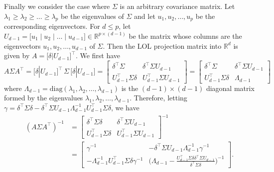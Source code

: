 \documentclass[10pt]{article}
\begin{document}
Finally we consider the case where $\Sigma$ is an arbitrary covariance matrix. Let $\lambda_1 \geq \lambda_2 \geq \dots \geq \lambda_{p}$ be the eigenvalues of $\Sigma$ and let $u_1, u_2, \dots, u_p$ be the corresponding eigenvectors. For $d \leq p$,  let $U_{d-1} = \bigl[ u_1 \mid u_2 \mid \dots \mid u_{d-1}] \in \mathbb{R}^{p \times (d-1)}$ be the matrix whose columns are the eigenvectors $u_1, u_2, \dots, u_{d-1}$ of $\Sigma$. Then the LOL projection matrix into $\mathbb{R}^{d}$ is given by $A = \bigl[ \delta | U_{d-1} \bigr]^{\top}$. We first have
\begin{equation*}
A \Sigma A^{\top} = \bigl[ \delta | U_{d-1} \bigr]^{\top}\, \Sigma \, \bigl[ \delta | U_{d-1} \bigr] = \begin{bmatrix} \delta^{\top} \Sigma & \delta^{\top} \Sigma U_{d-1} \\ U_{d-1}^{\top} \Sigma \delta & U_{d-1}^{\top} \Sigma U_{d-1} \end{bmatrix} = \begin{bmatrix} \delta^{\top} \Sigma & \delta^{\top} \Sigma U_{d-1} \\ U_{d-1}^{\top} \Sigma \delta & \Lambda_{d-1} \end{bmatrix}
\end{equation*}
where $\Lambda_{d-1} = \mathrm{diag}(\lambda_1, \lambda_2, \dots, \lambda_{d-1})$ is the $(d-1) \times (d-1)$ diagonal matrix formed by the eigenvalues $\lambda_1, \lambda_2, \dots, \lambda_{d-1}$.
Therefore, letting $\gamma = \delta^{\top} \Sigma \delta - \delta^{\top} \Sigma U_{d-1} \Lambda_{d-1}^{-1} U_{d-1}^{\top} \Sigma \delta$, we have
\begin{equation*}
\begin{split}
(A \Sigma A^{\top})^{-1} &= \begin{bmatrix} \delta^{\top} \Sigma \delta & \delta^{\top} \Sigma U_{d-1} \\ U_{d-1}^{\top} \Sigma \delta & U_{d-1}^{\top} \Sigma U_{d-1} \end{bmatrix}^{-1} \\
&= \begin{bmatrix} \gamma^{-1} & - \delta^{\top} \Sigma U_{d-1} \Lambda_{d-1}^{-1} \gamma^{-1} \\
- \Lambda_{d-1}^{-1} U_{d-1}^{\top} \Sigma \delta \gamma^{-1} & \bigl(\Lambda_{d-1} - \frac{U_{d-1}^{\top} \Sigma \delta \delta^{\top} \Sigma U_{d-1}}{\delta^{\top} \Sigma \delta} \bigr)^{-1} \end{bmatrix}.
\end{split}
\end{equation*}
\end{document}
